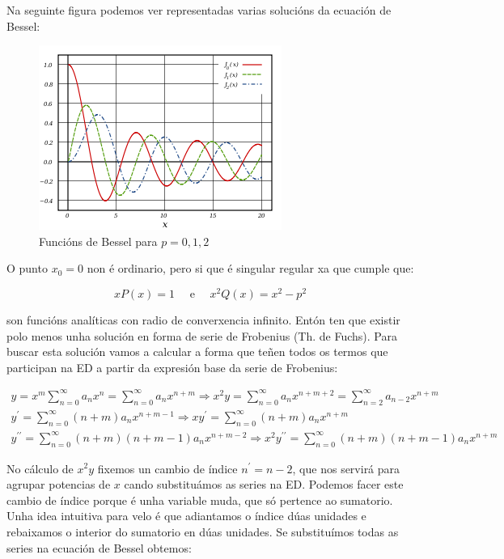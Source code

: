 \documentclass[a4paper,12pt,titlepage]{article}
\begin{document}
Na seguinte figura podemos ver representadas varias solucións da ecuación de Bessel:

\begin{figure}[h!]
    \centering
    \includegraphics[width=0.75\linewidth]{Images/bessel.png}
    \caption{Funcións de Bessel para $p=0,1,2$}    \label{Bessel 1 especie}
\end{figure}

O punto $x_0=0$ non é ordinario, pero si que é singular regular xa que cumple que:

$$
x P(x)=1 \quad \text { e } \quad x^{2} Q(x)=x^{2}-p^{2}
$$

son funcións analíticas con radio de converxencia infinito. Entón ten que existir polo menos unha solución en forma de serie de Frobenius (Th. de Fuchs). Para buscar esta solución vamos a calcular a forma que teñen todos os termos que participan na ED a partir da expresión base da serie de Frobenius:

\begin{equation*}
    \begin{gathered}
        y = x^{m}\sum_{n=0}^{\infty}a_{n} x^{n}=\sum_{n=0}^{\infty} a_{n} x^{n+m}  \Rightarrow  x^{2} y=\sum_{n=0}^{\infty} a_{n} x^{n+m+2}=\sum_{n=2}^{\infty} a_{n-2} x^{n+m}\\
        y^{\prime} =  \sum_{n=0}^{\infty}(n+m) a_{n} x^{n+m-1}  \Rightarrow  x y^{\prime}=\sum_{n=0}^{\infty}(n+m)a_{n} x^{n+m} \\
        y^{\prime \prime} = \sum_{n=0}^{\infty}(n+m)(n+m-1) a_{n} x^{n+m-2}  \Rightarrow  x^2y^{\prime \prime} = \sum_{n=0}^{\infty}(n+m)(n+m-1) a_{n} x^{n+m}
    \end{gathered}
\end{equation*}

No cálculo de $x^2y$ fixemos un cambio de índice $n^{\prime}=n-2$, que nos servirá para agrupar potencias de $x$ cando substituámos as series na ED. Podemos facer este cambio de índice porque é unha variable muda, que só pertence ao sumatorio. Unha idea intuitiva para velo é que adiantamos o índice dúas unidades e rebaixamos o interior do sumatorio en dúas unidades. Se substituímos todas as series na ecuación de Bessel obtemos:
\end{document}

